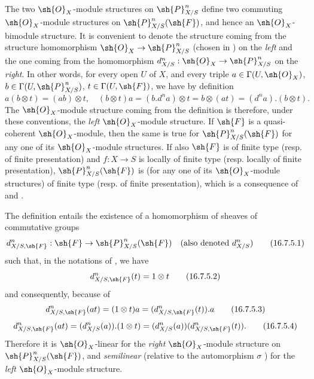 \begin{env}[16.7.4]
\label{IV.16.7.4}
The two $\sh{O}_X$-module structures on $\sh{P}_{X/S}^n$ define two commuting $\sh{O}_X$-module structures on $\sh{P}_{X/S}^n(\sh{F})$, and hence an $\sh{O}_X$-bimodule structure.
It is convenient to denote the structure coming from the structure homomorphism $\sh{O}_X \to \sh{P}_{X/S}^n$ (chosen in ) on the \emph{left} and the one coming from the homomorphism $d_{X/S}^n: \sh{O}_X \to \sh{P}_{X/S}^n$ on the \emph{right}.
In other words, for every open $U$ of $X$, and every triple $a \in \Gamma(U, \sh{O}_X)$, $b \in \Gamma(U, \sh{P}_{X/S}^n)$, $t \in \Gamma(U, \sh{F})$, we have by definition
\[
  \label{IV.16.7.4.1}
  a(b \otimes t) = (ab) \otimes t, \quad (b \otimes t)a = (b.d^n a) \otimes t = b \otimes (at) = (d^na).(b \otimes t).
  \tag{16.7.4.1}
\]
The $\sh{O}_X$-module structure coming from the definition  is therefore, under these conventions, the \emph{left} $\sh{O}_X$-module structure.
If $\sh{F}$ is a quasi-coherent $\sh{O}_X$-module, then the same is true for $\sh{P}_{X/S}^n(\sh{F})$ for any one of its $\sh{O}_X$-module structures.
If also $\sh{F}$ is of finite type (resp. of finite presentation) and $f:X \to S$ is locally of finite type (resp. locally of finite presentation), $\sh{P}_{X/S}^n(\sh{F})$ is (for any one of its $\sh{O}_X$-module structures) of finite type (resp. of finite presentation), which is a consequence of  and .
\end{env}

\begin{env}[16.7.5]
\label{IV.16.7.5}
The definition  entails the existence of a homomorphism of sheaves of commutative groups
\[
  \label{IV.16.7.5.1}
  d_{X/S, \sh{F}}^n: \sh{F} \to \sh{P}_{X/S}^n(\sh{F}) \quad (\text{also denoted } d_{X/S}^n)
  \tag{16.7.5.1}
\]
such that, in the notations of , we have
\[
  \label{IV.16.7.5.2}
  d_{X/S, \sh{F}}^n(t) = 1 \otimes t
  \tag{16.7.5.2}
\]
and consequently, because of 
\[
  \label{IV.16.7.5.3}
  d_{X/S, \sh{F}}^n(at) = (1 \otimes t) a = (d_{X/S, \sh{F}}^n(t)).a
  \tag{16.7.5.3}
\]
\[
  \label{IV.16.7.5.4}
  d_{X/S, \sh{F}}^n(at) = (d_{X/S}^n(a)).(1 \otimes t) = (d_{X/S}^n(a))(d_{X/S, \sh{F}}^n(t)).
  \tag{16.7.5.4}
\]
Therefore it is $\sh{O}_X$-linear for the \emph{right} $\sh{O}_X$-module structure on $\sh{P}_{X/S}^n(\sh{F})$, and \emph{semilinear} (relative to the automorphism $\sigma$ ) for the \emph{left} $\sh{O}_X$-module structure.
\end{env}

